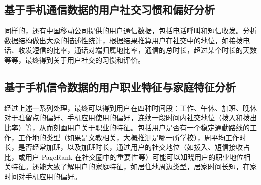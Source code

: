 \subsection{基于手机通信数据的用户社交习惯和偏好分析}

同样的，还有中国移动公司提供的用户通信数据，包括电话呼叫和短信收发。分析数据结构做出大众的描述性统计，根据结果推算用户在社交中的地位，如接拨电话、收发短信的比率，通话对端归属地比率，通信的总时长，超过某个时长的天数等等，最终得到关于用户社交的习惯和评价。

\subsection{基于手机信令数据的用户职业特征与家庭特征分析}

经过上述一系列处理，最终可以得到用户在四种时间段：工作、午休、加班、晚休对于驻留点的偏好、手机应用使用的偏好，连续一段时间内社交地位（拨入和拨出比率）等，从而刻画用户关于职业的特征。包括用户是否有一个稳定通勤路线的工作，工作地的类型（如果是文教相关，大概推测是哪一所学校），周平均工作时长，是否经常加班，以及加班时长，通过用户的社交地位（如拨入、短信接收占比，或用户 PageRank 在社交圈中的重要性等）可能可以知晓用户的职业地位相关特征。还能大致了解用户的家庭特征，如居住地周边类型，居家时间长短，在家时间对手机应用的偏好。

